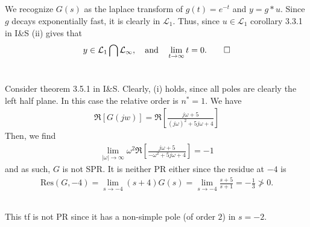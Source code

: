\documentclass[]{article}
\begin{document}
\subsection{}
We recognize $G(s)$ as the laplace transform of $g(t) = e^{-t}$ and $y=g*u$. Since $g$ decays exponentially fast, it is clearly in $\mathcal{L}_1$. Thus, since $u \in \mathcal{L_1}$ corollary 3.3.1 in I\&S (ii) gives that
\begin{equation}\begin{aligned}
y \in \mathcal{L}_1 \bigcap \mathcal{L}_\infty, \quad \text{and} \quad
\lim_{t\rightarrow \infty} t = 0. \qed
\end{aligned}\end{equation}

\section{}
\subsection{}
Consider theorem 3.5.1 in I\&S. Clearly, (i) holds, since all poles are clearly the left half plane. In this case the relative order is $n^* = 1$. We have
\begin{equation}\begin{aligned}
\Re \left[G(jw)\right] = \Re \left[\frac{j\omega + 5}{(j\omega)^2 + 5j\omega + 4} \right]
\end{aligned}\end{equation}
Then, we find
\begin{equation}\begin{aligned}
\lim_{|\omega| \rightarrow \infty} \omega^2 \Re \left[ \frac{j \omega + 5}{-\omega^2 + 5j \omega + 4} \right] = -1
\end{aligned}\end{equation}
and as such, $G$ is not SPR. It is neither PR either since the residue at $-4$ is
\begin{equation}\begin{aligned}
\text{Res}(G,-4) = \lim_{s \rightarrow -4} (s+4)G(s) = \lim_{s \rightarrow -4}\frac{s+5}{s+1} = -\frac{1}{3} \not > 0.
\end{aligned}\end{equation}

\subsection{}
This tf is not PR since it has a non-simple pole (of order $2$) in $s=-2$.
\end{document}
